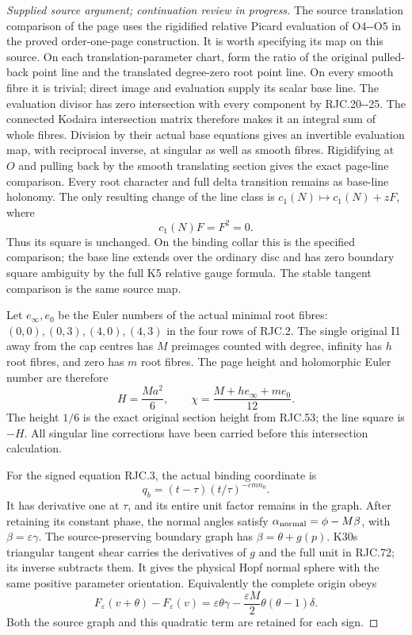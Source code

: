 \begin{proof}[Supplied source argument; continuation review in progress]
The source translation comparison of the page
uses the rigidified relative Picard evaluation
of O4-\/-O5 in the proved order-one-page construction.
It is worth specifying its map on this source.
On each translation-parameter chart, form the
ratio of the original pulled-back point line
and the translated degree-zero root point line.
On every smooth fibre it is trivial; direct
image and evaluation supply its scalar base line.
The evaluation divisor has zero intersection
with every component by RJC.20-\/-25.
The connected Kodaira intersection matrix
therefore makes it an integral sum of whole
fibres. Division by their actual base equations
gives an invertible evaluation map, with
reciprocal inverse, at singular as well as
smooth fibres.
Rigidifying at \(O\) and pulling back by the
smooth translating section gives the exact
page-line comparison.
Every root character and full delta transition
remains as base-line holonomy.
The only resulting change of the line class
is \(c_1(N)\mapsto c_1(N)+zF\), where
\[
 c_1(N)F=F^2=0.
 \tag{RJC.70}
\]
Thus its square is unchanged. On the binding
collar this is the specified comparison; the
base line extends over the ordinary disc and
has zero boundary square ambiguity by the
full K5 relative gauge formula. The stable
tangent comparison is the same source map.

Let \(e_\infty,e_0\) be the Euler numbers of
the actual minimal root fibres:
\((0,0),(0,3),(4,0),(4,3)\) in the four
rows of RJC.2.
The single original I1 away from the cap
centres has \(M\) preimages counted with
degree, infinity has \(h\) root fibres,
and zero has \(m\) root fibres.
The page height and holomorphic Euler number
are therefore
\[
 H=\frac{Ma^2}{6},\qquad
 \chi=\frac{M+h e_\infty+m e_0}{12}.
 \tag{RJC.71}
\]
The height \(1/6\) is the exact original
section height from RJC.53; the line square
is \(-H\).
All singular line corrections have been
carried before this intersection calculation.

For the signed equation RJC.3, the actual
binding coordinate is
\[
 q_b=(t-\tau)(t/\tau)^{-\varepsilon m n_0}.
 \tag{RJC.72}
\]
It has derivative one at \(\tau\), and its
entire unit factor remains in the graph.
After retaining its constant phase, the
normal angles satisfy
\(\alpha_{\rm normal}=\phi-M\beta\), with
\(\beta=\varepsilon\gamma\).
The source-preserving boundary graph has
\(\beta=\theta+g(p)\).
K30\textquotesingle s triangular tangent shear carries
the derivatives of \(g\) and the full unit
in RJC.72; its inverse subtracts them.
It gives the physical Hopf normal sphere
with the same positive parameter orientation.
Equivalently the complete origin obeys
\[
 F_\varepsilon(v+\theta)-F_\varepsilon(v)
 =\varepsilon\theta\gamma
   -\frac{\varepsilon M}{2}\theta(\theta-1)\delta.
 \tag{RJC.73}
\]
Both the source graph and this quadratic
term are retained for each sign.


\end{proof}
